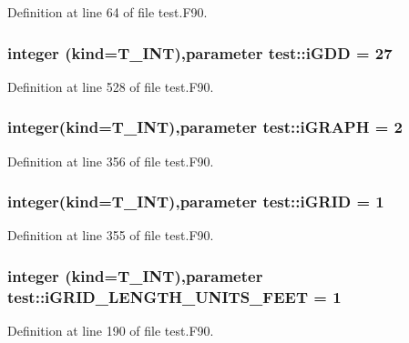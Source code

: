 Definition at line 64 of file test.F90.

\hypertarget{namespacetest_a488c52f0f7220cd4e5dfd202048bc6dd}{
\subsubsection[{iGDD}]{\setlength{\rightskip}{0pt plus 5cm}integer (kind={\bf T\_\-INT}),parameter {\bf test::iGDD} = 27}}
\label{namespacetest_a488c52f0f7220cd4e5dfd202048bc6dd}


Definition at line 528 of file test.F90.

\hypertarget{namespacetest_abc7de6feee74a86b9aa08b5951e94d08}{
\subsubsection[{iGRAPH}]{\setlength{\rightskip}{0pt plus 5cm}integer(kind={\bf T\_\-INT}),parameter {\bf test::iGRAPH} = 2}}
\label{namespacetest_abc7de6feee74a86b9aa08b5951e94d08}


Definition at line 356 of file test.F90.

\hypertarget{namespacetest_ab7d5ec03d44589c79aea69862eda7b7a}{
\subsubsection[{iGRID}]{\setlength{\rightskip}{0pt plus 5cm}integer(kind={\bf T\_\-INT}),parameter {\bf test::iGRID} = 1}}
\label{namespacetest_ab7d5ec03d44589c79aea69862eda7b7a}


Definition at line 355 of file test.F90.

\hypertarget{namespacetest_ac5e6e1cd934b6a95f6d38d6a1e1f6bac}{
\subsubsection[{iGRID\_\-LENGTH\_\-UNITS\_\-FEET}]{\setlength{\rightskip}{0pt plus 5cm}integer (kind={\bf T\_\-INT}),parameter {\bf test::iGRID\_\-LENGTH\_\-UNITS\_\-FEET} = 1}}
\label{namespacetest_ac5e6e1cd934b6a95f6d38d6a1e1f6bac}


Definition at line 190 of file test.F90.

